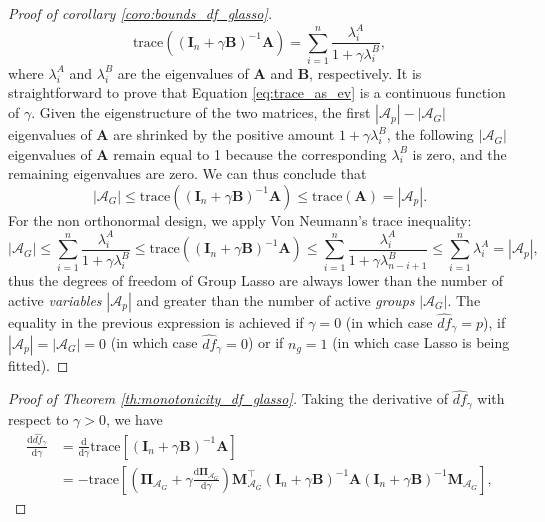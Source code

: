 \documentclass[a4paper, 12pt]{article}
\newcommand{\Aset}{\mathcal{A}}
\newcommand{\trace}{\mathrm{trace}}
\newcommand{\T}{\top}
\def\bPi{\boldsymbol{\Pi}}
\def\bA{\mathbf{A}}
\def\bB{\mathbf{B}}
\def\bI{\mathbf{I}}
\def\bM{\mathbf{M}}
\begin{document}
\begin{appendix}
\begin{proof}[Proof of corollary \ref{coro:bounds_df_glasso}]
\begin{equation}
\label{eq:trace_as_ev}
\text{trace} ((\bI_n+\gamma\bB)^{-1}\bA) = \sum_{i=1}^n \frac{\lambda_i^A}{1+\gamma\lambda_i^B},
\end{equation}
where $\lambda_i^A$ and $\lambda_i^B$ are the eigenvalues of $\bA$ and $\bB$, respectively. It is straightforward to prove that Equation \eqref{eq:trace_as_ev} is a continuous function of $\gamma$. Given the eigenstructure of the two matrices, the first $|\Aset_p| - |\Aset_G|$ eigenvalues of $\bA$ are shrinked by the positive amount $1 + \gamma\lambda_i^B$, the following $|\Aset_G|$ eigenvalues of $\bA$ remain equal to 1 because the corresponding $\lambda_i^B$ is zero, and the remaining eigenvalues are zero. We can thus conclude that 
$$ |\Aset_G| \leq \trace ((\bI_n+\gamma\bB)^{-1}\bA) \leq \trace(\bA) = |\Aset_p|.$$
For the non orthonormal design, we apply Von Neumann's trace inequality:
\begin{equation}
\label{eq:trace_as_ev2}
|\Aset_G| \leq \sum_{i=1}^n \frac{\lambda_i^A} {1+\gamma\lambda_{i}^B} \leq \text{trace} ((\bI_n+\gamma\bB)^{-1}\bA) \leq \sum_{i=1}^n \frac{\lambda_i^A} {1+\gamma\lambda_{n-i+1}^B} \leq \sum_{i=1}^n \lambda_i^A = |\Aset_p|,
\end{equation}
thus the degrees of freedom of Group Lasso are always lower than the number of active \textit{variables} $|\Aset_p|$ and greater than the number of active \textit{groups} $|\Aset_G|$.
The equality in the previous expression is achieved if $\gamma=0$ (in which case $\widehat{df}_\gamma = p$), if $|\Aset_p|= |\Aset_G|=0$ (in which case $\widehat{df}_\gamma = 0$) or if $n_g=1$ (in which case Lasso is being fitted).
\end{proof}
%
\begin{proof}[Proof of Theorem \ref{th:monotonicity_df_glasso}]
Taking the derivative of $\widehat{df}_\gamma$ with respect to $\gamma>0$, we have
\begin{equation*}
\begin{aligned}
\frac{\mathrm{d}\widehat{df}_\gamma}{\mathrm{d}\gamma}&=
\frac{\mathrm{d}}{\mathrm{d}\gamma} \trace\left[\left(\bI_n+\gamma  \bB\right)^{-1}  \bA\right]\\
&=-\trace\left[\left( \bPi_{\Aset_G}+\gamma \frac{\mathrm{d}  \bPi_{\Aset_G}}{\mathrm{d} \gamma}\right)\bM_{\Aset_G}^{\T}\left( \bI_n+\gamma  \bB\right)^{-1}  \bA\left( \bI_n+\gamma  \bB\right)^{-1}\bM_{\Aset_G}\right],
\end{aligned}

\end{equation*}
\end{proof}
\end{appendix}
\end{document}
